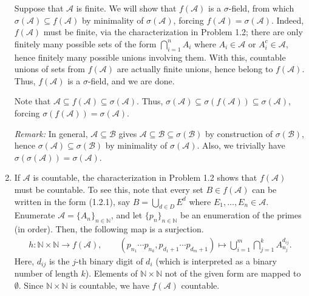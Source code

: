 \documentclass[11pt]{article}
\newcommand{\N}{\mathbb{N}}
\begin{document}
\begin{enumerate}
        Suppose that $\mathcal{A}$ is finite.
        We will show that $f(\mathcal{A})$ is a $\sigma$-field, from which
        $\sigma(\mathcal{A}) \subseteq f(\mathcal{A})$ by minimality of
        $\sigma(\mathcal{A})$, forcing $f(\mathcal{A}) = \sigma(\mathcal{A})$.
        Indeed, $f(\mathcal{A})$ must be finite, via the characterization in
        Problem 1.2; there are only finitely many possible sets of the form
        $\bigcap_{i = 1}^n A_i$ where $A_i \in \mathcal{A}$ or $A_i^c \in
        \mathcal{A}$, hence finitely many possible unions involving them.
        With this, countable unions of sets from $f(\mathcal{A})$ are actually
        finite unions, hence belong to $f(\mathcal{A})$.
        Thus, $f(\mathcal{A})$ is a $\sigma$-field, and we are done.

        Note that $\mathcal{A} \subseteq f(\mathcal{A}) \subseteq
        \sigma(\mathcal{A})$.
        Thus, $\sigma(\mathcal{A}) \subseteq \sigma(f(\mathcal{A})) \subseteq
        \sigma(\mathcal{A})$, forcing $\sigma(f(\mathcal{A})) =
        \sigma(\mathcal{A})$.

        \emph{Remark:} In general, $\mathcal{A} \subseteq \mathcal{B}$ gives
        $\mathcal{A} \subseteq \mathcal{B} \subseteq \sigma(\mathcal{B})$ by
        construction of $\sigma(\mathcal{B})$, hence $\sigma(\mathcal{A})
        \subseteq \sigma(\mathcal{B})$ by minimality of $\sigma(\mathcal{A})$.
        Also, we trivially have $\sigma(\sigma(\mathcal{A})) =
        \sigma(\mathcal{A})$.



        \item If $\mathcal{A}$ is countable, the characterization in Problem
        1.2 shows that $f(\mathcal{A})$ must be countable.
        To see this, note that every set $B \in f(\mathcal{A})$ can be written in
        the form (1.2.1), say $B = \bigcup_{d \in D} E^d$ where $E_1, \dots,
        E_n \in \mathcal{A}$.
        Enumerate $\mathcal{A} = \{A_n\}_{n \in \N}$, and let $\{p_n\}_{n \in
        \N}$ be an enumeration of the primes (in order).
        Then, the following map is a surjection. \begin{align*}
            h\colon \N\times\N \to f(\mathcal{A}), \qquad
            (p_{n_1}\cdots p_{n_k}, p_{d_1 + 1}\cdots p_{d_m + 1}) \mapsto \bigcup_{i = 1}^{m} \bigcap_{j = 1}^k A_{n_j}^{d_{ij}}.
        \end{align*}
        Here, $d_{ij}$ is the $j$-th binary digit of $d_i$ (which is
        interpreted as a binary number of length $k$).
        Elements of $\N\times \N$ not of the given form are mapped to
        $\emptyset$.
        Since $\N\times\N$ is countable, we have $f(\mathcal{A})$ countable.




\end{enumerate}
\end{document}
